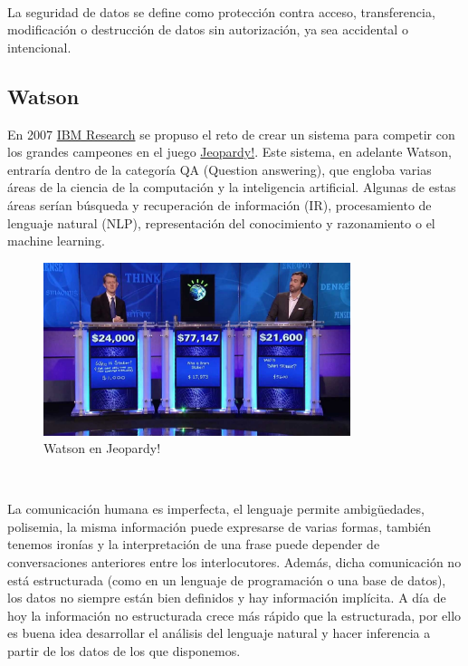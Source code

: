 \documentclass[paper=a4, fontsize=10pt]{scrartcl} %
\numberwithin{equation}{section} %
\numberwithin{figure}{section} %
\numberwithin{table}{section} %
\begin{document}
\

La seguridad de datos se define como protección contra acceso, transferencia, modificación o destrucción de datos sin autorización, ya sea accidental o intencional.












\subsection{Watson}
En 2007 \href{https://www.research.ibm.com/}{IBM Research} se propuso el reto de crear un sistema para competir con los grandes campeones en el juego \href{https://www.jeopardy.com/}{Jeopardy!}. 
Este sistema, en adelante Watson, entraría dentro de la categoría QA (Question answering), que engloba varias áreas de la ciencia de la computación y la inteligencia artificial. 
Algunas de estas áreas serían búsqueda y recuperación de información (IR), procesamiento de lenguaje natural (NLP), representación del conocimiento y razonamiento o el machine learning.

\begin{figure}[H]
	\centering
	\label{j-watson}
	\includegraphics[width=0.8\textwidth]{./Imagenes/j-watson.jpg}
	\caption{Watson en Jeopardy!}
\end{figure}

\

La comunicación humana es imperfecta, el lenguaje permite ambigüedades, polisemia, la misma información puede expresarse de varias formas, también tenemos ironías y la interpretación de una frase puede depender de conversaciones anteriores entre los interlocutores.
Además, dicha comunicación no está estructurada (como en un lenguaje de programación o una base de datos), los datos no siempre están bien definidos y hay información implícita.
A día de hoy la información no estructurada crece más rápido que la estructurada, por ello es buena idea desarrollar el análisis del lenguaje natural y hacer inferencia a partir de los datos de los que disponemos.
\end{document}
